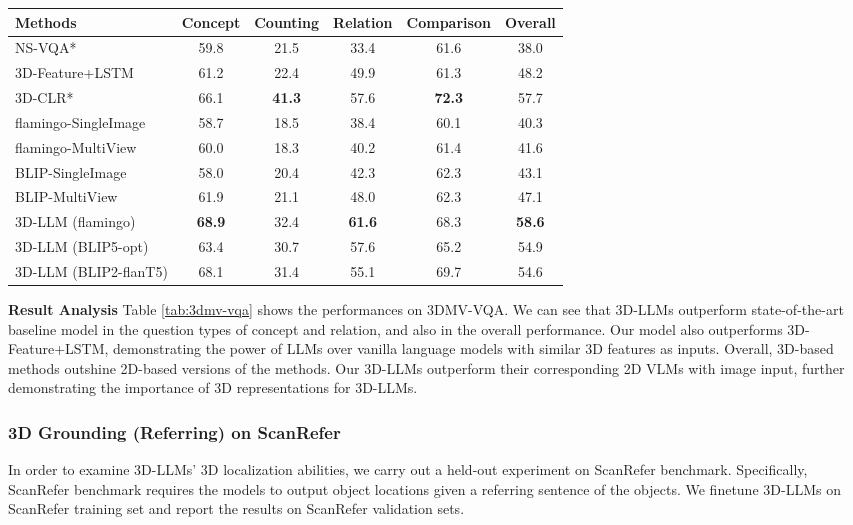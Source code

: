 \begin{table*}[htbp]
	\begin{center}\small
 
	\begin{tabular}{lccccc}
	\hline 
      Methods   & Concept & Counting & Relation& Comparison & Overall\\ 
     
    \hline 
NS-VQA* &59.8&21.5&33.4&61.6 &38.0\\ 
        3D-Feature+LSTM  &61.2 &22.4 & 49.9 & 61.3 &48.2\\ 
        3D-CLR*  & 66.1 & \textbf{41.3} & 57.6&  \textbf{72.3} & 57.7\\ 
    \hline 
       flamingo-SingleImage &58.7 & 18.5 & 38.4 &60.1 & 40.3\\
       flamingo-MultiView &60.0 & 18.3 & 40.2 & 61.4 & 41.6\\
       BLIP-SingleImage & 58.0 & 20.4 & 42.3 & 62.3 & 43.1\\
       BLIP-MultiView & 61.9 & 21.1 & 48.0 & 62.3 & 47.1\\
    \hline 
        3D-LLM (flamingo) & \textbf{68.9} & 32.4 & \textbf{61.6} & 68.3 & \textbf{58.6}\\
        3D-LLM (BLIP5-opt) & 63.4 & 30.7 & 57.6 & 65.2 & 54.9\\
        3D-LLM (BLIP2-flanT5)  & 68.1 & 31.4 & 55.1 & 69.7 & 54.6\\
    \hline 
	\end{tabular}
	\end{center}
        \vspace{-1em}
	\caption{Experimental results on 3DMV-VQA dataset. * denotes using explicit object representations and neuro-symbolic reasoning. }
    \label{tab:3dmv-vqa}
\end{table*}

\textbf{Result Analysis} Table \ref{tab:3dmv-vqa} shows the performances on 3DMV-VQA. We can see that 3D-LLMs outperform state-of-the-art baseline model in the question types of concept and relation, and also in the overall performance. Our model also outperforms 3D-Feature+LSTM, demonstrating the power of LLMs over vanilla language models with similar 3D features as inputs. Overall, 3D-based methods outshine 2D-based versions of the methods. Our 3D-LLMs outperform their corresponding 2D VLMs with image input, further demonstrating the importance of 3D representations for 3D-LLMs.

\subsubsection{3D Grounding (Referring) on ScanRefer}
    In order to examine 3D-LLMs' 3D localization abilities, we carry out a held-out experiment on ScanRefer benchmark. Specifically, ScanRefer benchmark requires the models to output object locations given a referring sentence of the objects. We finetune 3D-LLMs on ScanRefer training set and report the results on ScanRefer validation sets.

